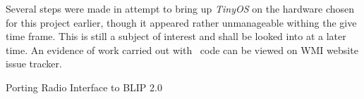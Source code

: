   Several steps were made in attempt to bring up \emph{TinyOS} on the
 hardware chosen for this project earlier, though it appeared rather
 unmanageable withing the give time frame. This is still a subject
 of interest and shall be looked into at a later time. An evidence of
 work carried out with \TinyOS\ code can be viewed on WMI website
 issue tracker.

\TrackerList
  Porting Radio Interface to BLIP 2.0
\TrackerEnd






